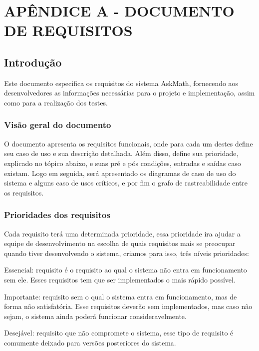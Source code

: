 \chapter*{APÊNDICE A - DOCUMENTO DE REQUISITOS}\label{apendice_requisitos}


\section{Introdução}
Este documento especifica os requisitos do sistema AskMath, fornecendo aos desenvolvedores as informações necessárias para o projeto e implementação, assim como para a realização dos testes. 

\subsection{Visão geral do documento}
O documento apresenta os requisitos funcionais, onde para cada um destes define seu caso de uso e sua descrição detalhada. Além disso, define sua prioridade, explicado no tópico abaixo, e suas pré e pós condições, entradas e saídas caso existam. Logo em seguida, será apresentado os diagramas de caso de uso do sistema e alguns caso de usos críticos, e por fim o grafo de rastreabilidade entre os requisitos.

\subsection{Prioridades dos requisitos}
Cada requisito terá uma determinada prioridade, essa prioridade ira ajudar a equipe de desenvolvimento na escolha de quais requisitos mais se preocupar quando tiver desenvolvendo o sistema, criamos para isso, três níveis prioridades:

\begin{alineascomponto}
	\item Essencial: requisito é o requisito ao qual o sistema não entra em funcionamento sem ele. Esses requisitos tem que ser implementados o mais rápido possível. 
    \item Importante: requisito sem o qual o sistema entra em funcionamento, mas de forma não satisfatória. Esse requisitos deverão sem implementados, mas caso não sejam, o sistema ainda poderá funcionar consideravelmente.
	\item Desejável: requisito que não compromete o sistema, esse tipo de requisito é comumente deixado para versões posteriores do sistema.
\end{alineascomponto}


